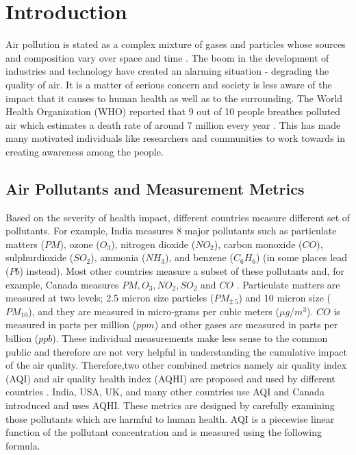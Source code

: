 \chapter{Introduction}
\setcounter{page}{1}





Air pollution is stated as a complex mixture of gases and particles whose sources and composition vary over
space and time \cite{HealthEffectsInstitute2017}. The boom in the development of industries and technology have created an alarming situation - degrading the quality of air. It is a matter of serious concern and society is less aware of the impact that it causes to human health as well as to the surrounding. The World Health Organization (WHO) reported that 9 out of 10 people breathes polluted air which estimates a death rate of around 7 million every year \cite{who} \cite{WHO2010}. This has made many motivated individuals like researchers and communities to work towards in creating awareness among the people.


\section{Air Pollutants and Measurement Metrics}

Based on the severity of health impact, different countries measure different set of pollutants. For example, India measures 8 major pollutants such as particulate matters ($PM$), ozone ($O_3$),  nitrogen dioxide ($NO_2$), carbon monoxide ($CO$), sulphurdioxide ($SO_2$), ammonia ($NH_3$), and benzene ($C_6H_6$) (in some places lead ($Pb$) instead). Most other countries measure a subset of these pollutants and, for example, Canada measures $PM, O_3, NO_2, SO_2$ and $CO$ \cite{Chen2013}.
Particulate matters are measured at two levels; 2.5 micron size particles ($PM_{2.5}$) and 10 micron size ($PM_{10}$), and they are measured in micro-grams per cubic meters ($\mu g/m^3$). $CO$ is measured in parts per million ($ppm$) and other gases are measured in parts per billion ($ppb$). These individual measurements make less sense to the common public and therefore are not very helpful in understanding the cumulative 
impact of the air quality. Therefore,two other combined metrics namely air quality index (AQI) and air quality health index (AQHI) are proposed and used by different countries \cite{Chen2013}. India, USA, UK, and many other countries use AQI and Canada introduced and uses AQHI. These metrics are designed  by carefully examining those pollutants which are harmful to human health.
AQI is a piecewise linear function of the pollutant concentration and is measured using the following formula.

